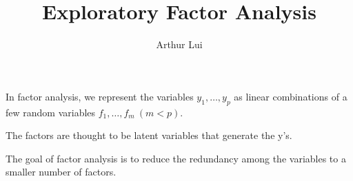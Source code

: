 \documentclass{beamer}
\title%
{
  Exploratory Factor Analysis     
}
\author[Arthur Lui]{Arthur Lui} %
\institute[Brigham Young University]{
  Department of Statistics\\
  Brigham Young University
}
\def\wl{\par \vspace{\baselineskip}}
\begin{document}
  \begin{frame}
    \titlepage
  \end{frame}  

  \begin{frame}
    In factor analysis, we represent the variables $y_1,\dots, y_p$
    as linear combinations of a few random variables $f_1,\dots,f_m~(m < p)$.\\
    \wl\noindent
    The factors are thought to be latent variables that generate the y's.\\
    \wl\noindent
    The goal of factor analysis is to reduce the redundancy among the variables
    to a smaller number of factors.
  \end{frame}
\end{document}
